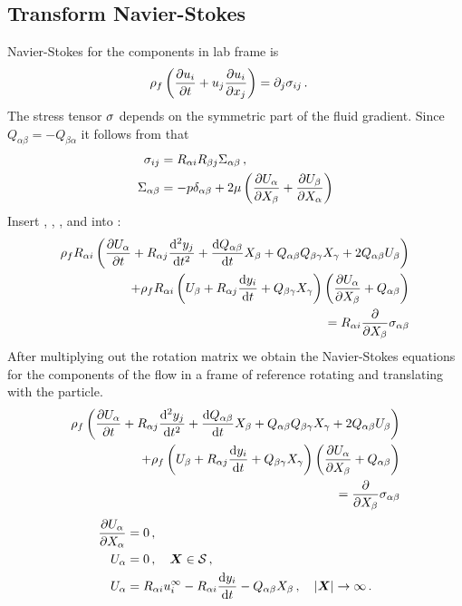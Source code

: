 \documentclass[thesis.tex]{subfiles}
\begin{document}
\subsection{Transform Navier-Stokes}
Navier-Stokes for the components in lab frame is
\begin{align}
    \rho_f\left(\pdiff{u_i}{t} + u_j\pdiff{u_i}{x_j}\right) &= \partial_j \sigma_{ij}\,.\eqnlab{nslab}
\end{align}
The stress tensor $\mathbb{\sigma}$ depends on the symmetric part of the fluid gradient. Since $Q_{\alpha \beta}=-Q_{\beta \alpha}$ it follows from  that
\begin{align}
	\sigma_{ij} &= R_{\alpha i}R_{\beta j}\Sigma_{\alpha \beta}\,,\nn\\
	\Sigma_{\alpha \beta} &= -p \delta_{\alpha \beta} + 2\mu \left(\pdiff{U_\alpha}{X_\beta}+\pdiff{U_\beta}{X_\alpha}\right)\eqnlab{sigma_particle}
\end{align}
Insert , , , and  into :
\begin{align}
	\rho_f R_{\alpha i}\left(\frac{\partial U_\alpha}{\partial t} + R_{\alpha j}\frac{\mathrm{d}^2y_j}{\mathrm{d} t^2} + \frac{\mathrm{d} Q_{\alpha \beta}}{\mathrm{d} t}X_\beta + Q_{\alpha \beta}Q_{\beta \gamma}X_\gamma + 2Q_{\alpha \beta}U_\beta \right) \nonumber \\
	+ \rho_f R_{\alpha i}\left(U_\beta + R_{\alpha j}\frac{\mathrm{d} y_i}{\mathrm{d} t}+Q_{\beta \gamma}X_\gamma\right)\left(\frac{\partial U_\alpha}{\partial X_\beta}+Q_{\alpha \beta}\right) \nonumber \\
	= R_{\alpha i}\frac{\partial }{\partial X_\beta} \sigma_{\alpha \beta}
\end{align}
After multiplying out the rotation matrix we obtain the Navier-Stokes equations for the components of the flow in a frame of reference rotating and translating with the particle.
\begin{align}
	\rho_f \left(\pdiff{U_\alpha}{t} + R_{\alpha j}\frac{\rd^2y_j}{\rd t^2} + \diff{Q_{\alpha \beta}}{t}X_\beta + Q_{\alpha \beta}Q_{\beta \gamma}X_\gamma + 2Q_{\alpha \beta}U_\beta \right) \nn \\
	+ \rho_f \left(U_\beta + R_{\alpha j}\diff{y_i}{t}+Q_{\beta \gamma}X_\gamma\right)\left(\pdiff{U_\alpha}{X_\beta}+Q_{\alpha \beta}\right) \nn \\
	= \pdiff{}{X_\beta} \sigma_{\alpha \beta}\eqnlab{nspar}
\end{align}
\begin{align}
	\frac{\partial U_\alpha}{\partial X_\alpha} &= 0\,, \\
	U_\alpha &= 0\,,\quad \mbox{\boldmath$X$} \in \mathcal S\,, \\
	U_\alpha &= R_{\alpha i}u^\infty_i - R_{\alpha i}\frac{\mathrm{d} y_i}{\mathrm{d} t} - Q_{\alpha \beta} X_\beta\,,\quad|\mbox{\boldmath$X$}|\to\infty\,.
\end{align}
\end{document}
